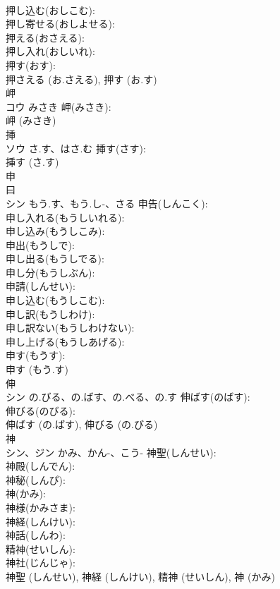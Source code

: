 \documentclass[8pt]{extreport}
\begin{document}
\begin{CJK}{UTF8}{min}
\\	押し込む(おしこむ): 
\\	押し寄せる(おしよせる): 
\\	押える(おさえる): 
\\	押し入れ(おしいれ): 
\\	押す(おす): 
\\	押さえる (お.さえる), 押す (お.す)
\\	岬			
\\	コウ	みさき	岬(みさき): 
\\	岬 (みさき)
\\	挿			
\\	ソウ	さ.す、はさ.む	挿す(さす): 
\\	挿す (さ.す)
\\	申			
\\	曰 
\\	シン	もう.す、もう.し-、さる	申告(しんこく): 
\\	申し入れる(もうしいれる): 
\\	申し込み(もうしこみ): 
\\	申出(もうしで): 
\\	申し出る(もうしでる): 
\\	申し分(もうしぶん): 
\\	申請(しんせい): 
\\	申し込む(もうしこむ): 
\\	申し訳(もうしわけ): 
\\	申し訳ない(もうしわけない): 
\\	申し上げる(もうしあげる): 
\\	申す(もうす): 
\\	申す (もう.す)
\\	伸			
\\	シン	の.びる、の.ばす、の.べる、の.す	伸ばす(のばす): 
\\	伸びる(のびる): 
\\	伸ばす (の.ばす), 伸びる (の.びる)
\\	神			
\\	シン、ジン	かみ、かん-、こう-	神聖(しんせい): 
\\	神殿(しんでん): 
\\	神秘(しんぴ): 
\\	神(かみ): 
\\	神様(かみさま): 
\\	神経(しんけい): 
\\	神話(しんわ): 
\\	精神(せいしん): 
\\	神社(じんじゃ): 
\\	神聖 (しんせい), 神経 (しんけい), 精神 (せいしん), 神 (かみ)

\end{CJK}
\end{document}
